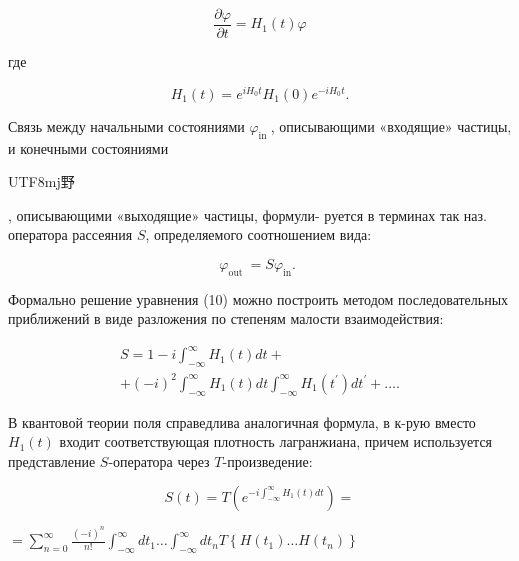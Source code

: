 \documentclass[10pt]{article}
\begin{document}
\[

\frac{\partial \varphi}{\partial t}=H_{1}(t) \varphi

\]



где



\[

H_{1}(t)=e^{i H_{0} t} H_{1}(0) e^{-i H_{0} t} .

\]



Связь между начальными состояниями $\varphi_{\text {in }}$, описывающими «входящие» частицы, и конечными состояниями \begin{CJK}{UTF8}{mj}野\end{CJK}, описывающими «выходящие» частицы, формули- руется в терминах так наз. оператора рассеяния $S$, определяемого соотношением вида:



\[

\varphi_{\text {out }}=S \varphi_{\mathrm{in}} \text {. }

\]



Формально решение уравнения (10) можно построить методом последовательных приближений в виде разложения по степеням малости взаимодействия:



\[

\begin{gathered}

S=1-i \int_{-\infty}^{\infty} H_{1}(t) d t+ \\

+(-i)^{2} \int_{-\infty}^{\infty} H_{1}(t) d t \int_{-\infty}^{\infty} H_{1}\left(t^{\prime}\right) d t^{\prime}+\ldots .

\end{gathered}

\]



В квантовой теории поля справедлива аналогичная формула, в к-рую вместо $H_{1}(t)$ входит соответствующая плотность лагранжиана, причем используется представление $S$-оператора через $T$-произведение:



\[

S(t)=T\left(e^{-i \int_{-\infty}^{\infty} H_{1}(t) d t}\right)=

\]



$=\sum_{n=0}^{\infty} \frac{(-i)^{n}}{n !} \int_{-\infty}^{\infty} d t_{1} \ldots \int_{-\infty}^{\infty} d t_{n} T\left\{H\left(t_{1}\right) \ldots H\left(t_{n}\right)\right\}$
\end{document}
